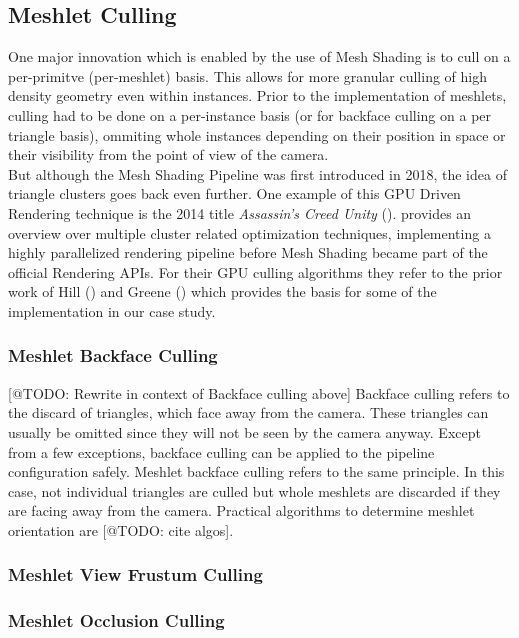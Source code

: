 \subsection{Meshlet Culling} \label{subsec-meshlet-culling}

One major innovation which is enabled by the use of Mesh Shading is to cull on a per-primitve (per-meshlet) basis. 
This allows for more granular culling of high density geometry even within instances. Prior to the implementation 
of meshlets, culling had to be done on a per-instance basis (or for backface culling on a per triangle basis), 
ommiting whole instances depending on their position in space or their visibility from the point of view of the camera.\\

\noindent
But although the Mesh Shading Pipeline was first introduced in 2018, the idea of triangle clusters goes back even further.
One example of this \ac{GPU} Driven Rendering technique is the 2014 title \emph{Assassin's Creed Unity} (\cite{Ubisoft2014}).
\cite{Aaltonen2015} provides an overview over multiple cluster related optimization techniques, implementing a highly 
parallelized rendering pipeline before Mesh Shading became part of the official Rendering \ac{API}s.
For their \ac{GPU} culling algorithms they refer to the prior work of Hill (\cite{Hill11}) and Greene (\cite{Greene93}) which 
provides the basis for some of the implementation in our case study.


\subsubsection{Meshlet Backface Culling} \label{subsubsec-meshlet-backface-culling}

[@TODO: Rewrite in context of Backface culling above]
Backface culling refers to the discard of triangles, which face away from the camera. These triangles can usually be omitted 
since they will not be seen by the camera anyway. Except from a few exceptions, backface culling can be applied to the 
pipeline configuration safely. Meshlet backface culling refers to the same principle. In this case, not individual triangles  
are culled but whole meshlets are discarded if they are facing away from the camera. Practical algorithms to determine meshlet 
orientation are [@TODO: cite algos].\\ %


\subsubsection{Meshlet View Frustum Culling} \label{subsubsec-meshlet-view-frustum-culling}

\subsubsection{Meshlet Occlusion Culling} \label{subsubsec-meshlet-occlusion-culling}